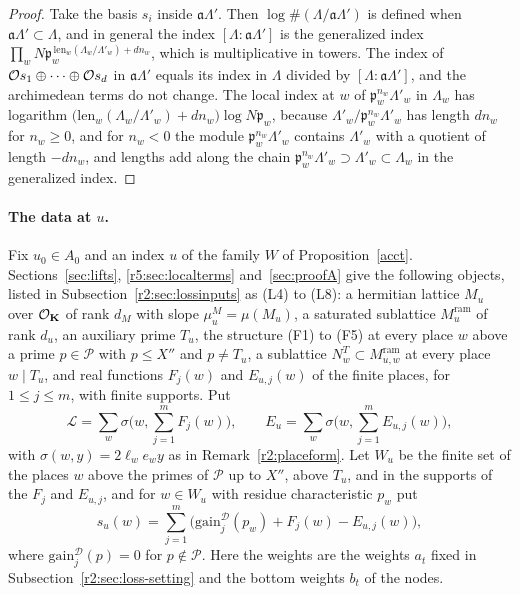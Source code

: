 \begin{proof}
Take the basis $s_i$ inside $\mathfrak a\Lambda'$. Then $\log\#(\Lambda/\mathfrak a\Lambda')$ is defined when $\mathfrak a\Lambda'\subset\Lambda$, and in general the index $[\Lambda:\mathfrak a\Lambda']$ is the generalized index $\prod_wN\mathfrak p_w^{\,\mathrm{len}_w(\Lambda_w/\Lambda'_w)+dn_w}$, which is multiplicative in towers. The index of $\mathcal O s_1\oplus\dots\oplus\mathcal O s_d$ in $\mathfrak a\Lambda'$ equals its index in $\Lambda$ divided by $[\Lambda:\mathfrak a\Lambda']$, and the archimedean terms do not change. The local index at $w$ of $\mathfrak p_w^{n_w}\Lambda'_w$ in $\Lambda_w$ has logarithm $\big(\mathrm{len}_w(\Lambda_w/\Lambda'_w)+dn_w\big)\log N\mathfrak p_w$, because $\Lambda'_w/\mathfrak p_w^{n_w}\Lambda'_w$ has length $dn_w$ for $n_w\ge0$, and for $n_w<0$ the module $\mathfrak p_w^{n_w}\Lambda'_w$ contains $\Lambda'_w$ with a quotient of length $-dn_w$, and lengths add along the chain $\mathfrak p_w^{n_w}\Lambda'_w\supset\Lambda'_w\subset\Lambda_w$ in the generalized index.
\end{proof}

\paragraph{The data at $u$.} Fix $u_0\in A_0$ and an index $u$ of the family $W$ of Proposition~\ref{acct}. Sections~\ref{sec:lifts}, \ref{r5:sec:localterms} and~\ref{sec:proofA} give the following objects, listed in Subsection~\ref{r2:sec:lossinputs} as (L4) to (L8): a hermitian lattice $M_u$ over $\mathcal O_\mathbf K$ of rank $d_M$ with slope $\mu^M_u=\mu(M_u)$, a saturated sublattice $M^{\mathrm{ram}}_u$ of rank $d_u$, an auxiliary prime $T_u$, the structure (F1) to (F5) at every place $w$ above a prime $p\in\mathcal P$ with $p\le X''$ and $p\ne T_u$, a sublattice $N^T_w\subset M^{\mathrm{ram}}_{u,w}$ at every place $w\mid T_u$, and real functions $F_j(w)$ and $E_{u,j}(w)$ of the finite places, for $1\le j\le m$, with finite supports. Put
\[
\mathcal L=\sum_w\sigma\Big(w,\sum_{j=1}^mF_j(w)\Big),\qquad E_u=\sum_w\sigma\Big(w,\sum_{j=1}^mE_{u,j}(w)\Big),
\]
with $\sigma(w,y)=2\ell_we_wy$ as in Remark~\ref{r2:placeform}. Let $W_u$ be the finite set of the places $w$ above the primes of $\mathcal P$ up to $X''$, above $T_u$, and in the supports of the $F_j$ and $E_{u,j}$, and for $w\in W_u$ with residue characteristic $p_w$ put
\[
s_u(w)=\sum_{j=1}^m\Big(\mathrm{gain}^{\mathcal D}_j(p_w)+F_j(w)-E_{u,j}(w)\Big),
\]
where $\mathrm{gain}^{\mathcal D}_j(p)=0$ for $p\notin\mathcal P$. Here the weights are the weights $a_t$ fixed in Subsection~\ref{r2:sec:loss-setting} and the bottom weights $b_t$ of the nodes.

